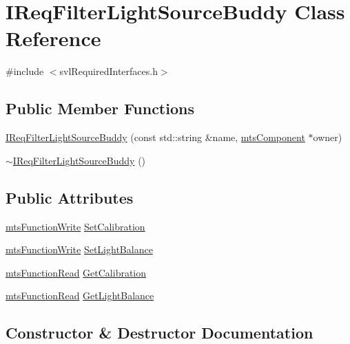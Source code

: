 \hypertarget{class_i_req_filter_light_source_buddy}{}\section{I\+Req\+Filter\+Light\+Source\+Buddy Class Reference}
\label{class_i_req_filter_light_source_buddy}


{\ttfamily \#include $<$svl\+Required\+Interfaces.\+h$>$}

\subsection*{Public Member Functions}
\begin{DoxyCompactItemize}
\item 
\hyperlink{class_i_req_filter_light_source_buddy_acf3f813df1b310c77b6dab1199d1a1da}{I\+Req\+Filter\+Light\+Source\+Buddy} (const std\+::string \&name, \hyperlink{classmts_component}{mts\+Component} $\ast$owner)
\item 
\hyperlink{class_i_req_filter_light_source_buddy_a80ecde855ca1c8f8f622b3774c3d0448}{$\sim$\+I\+Req\+Filter\+Light\+Source\+Buddy} ()
\end{DoxyCompactItemize}
\subsection*{Public Attributes}
\begin{DoxyCompactItemize}
\item 
\hyperlink{classmts_function_write}{mts\+Function\+Write} \hyperlink{class_i_req_filter_light_source_buddy_a935725df98772111c6bb59934969bbad}{Set\+Calibration}
\item 
\hyperlink{classmts_function_write}{mts\+Function\+Write} \hyperlink{class_i_req_filter_light_source_buddy_a27a4cb9b757819473851dc8ba62e1241}{Set\+Light\+Balance}
\item 
\hyperlink{classmts_function_read}{mts\+Function\+Read} \hyperlink{class_i_req_filter_light_source_buddy_ad55805514f5fd65daffc97e1e0a17960}{Get\+Calibration}
\item 
\hyperlink{classmts_function_read}{mts\+Function\+Read} \hyperlink{class_i_req_filter_light_source_buddy_a02d7dd402542d60b0e2a8eab49ae0996}{Get\+Light\+Balance}
\end{DoxyCompactItemize}


\subsection{Constructor \& Destructor Documentation}
\hypertarget{class_i_req_filter_light_source_buddy_acf3f813df1b310c77b6dab1199d1a1da}{}
